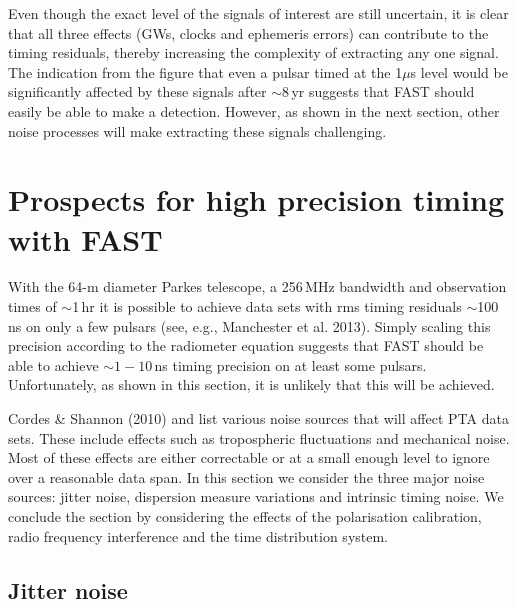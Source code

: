 \documentclass{raa}            %
\begin{document}
Even though the exact level of the signals of interest are still uncertain, it is clear that all three effects (GWs, clocks and ephemeris errors) can contribute to the timing residuals, thereby increasing the complexity of extracting any one signal.  The indication from the figure that even a pulsar timed at the 1$\mu$s level would be significantly affected by these signals after $\sim 8$\,yr suggests that FAST should easily be able to make a detection.  However, as shown in the next section, other noise processes will make extracting these signals challenging.

\section{Prospects for high precision timing with FAST}\label{sec:limitNoise}

With the 64-m diameter Parkes telescope, a 256\,MHz bandwidth and observation times of $\sim$1\,hr  it is possible to achieve data sets with rms timing residuals $\sim$100\,ns  on only a few pulsars (see, e.g., Manchester et al. 2013\nocite{mhb+13}). Simply scaling this precision according to the radiometer equation suggests that FAST should be able to achieve $\sim 1-10$\,ns timing precision on at least some pulsars.  Unfortunately, as shown in this section, it is unlikely that this will be achieved.

Cordes \& Shannon (2010) and \cite{jat11} list various noise sources that will affect PTA data sets.  These include effects such as tropospheric fluctuations and mechanical noise.  Most of these effects are either correctable or at a small enough level to ignore over a reasonable data span.  In this section we consider the three major noise sources: jitter noise, dispersion measure variations and intrinsic timing noise.  We conclude the section by considering the effects of the polarisation calibration, radio frequency interference and the time distribution system.




\subsection{Jitter noise}
\end{document}
